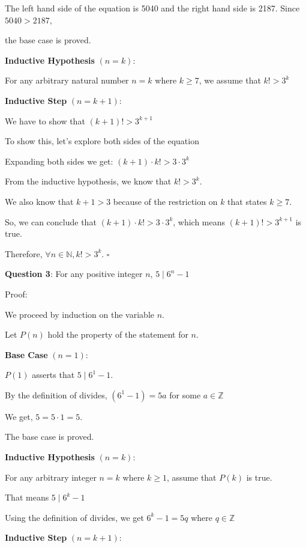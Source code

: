\documentclass{article} %
\newcommand{\question}[2][]{\begin{flushleft}
        \textbf{Question #1}: #2

\end{flushleft}}
\begin{document}
    The left hand side of the equation is 5040 and the right hand side is 2187. Since $5040 > 2187$, 
    
    the base case is proved.

    \textbf{Inductive Hypothesis} $(n = k)$:

    For any arbitrary natural number $n = k$ where $k \geq 7$, we assume that $k! > 3^k$

    \textbf{Inductive Step} $(n = k + 1)$:

    We have to show that $(k + 1)! > 3^{k + 1}$

    To show this, let's explore both sides of the equation

    Expanding both sides we get: $(k + 1) \cdot k! > 3 \cdot 3^k$ 

    From the inductive hypothesis, we know that $k! > 3^k$.

    We also know that $k + 1 > 3$ because of the restriction on $k$ that states $k \geq 7$.

    So, we can conclude that $(k + 1) \cdot k! > 3 \cdot 3^k$, which means $(k + 1)! > 3^{k + 1}$ is true.

    Therefore, $\forall n \in \mathbb{N}, k! > 3^k$. $\square$


    \newpage

    \question[3]{For any positive integer $n$, $5 \mid 6^n - 1$}

    Proof:

    We proceed by induction on the variable $n$.

    Let $P(n)$ hold the property of the statement for $n$.

    \textbf{Base Case} $(n = 1)$:

    $P(1)$ asserts that $5 \mid 6^1 - 1$.

    By the definition of divides, $(6^1 - 1) = 5a$ for some $a \in \mathbb{Z}$

    We get, $5 = 5 \cdot 1 = 5$.

    The base case is proved.

    \textbf{Inductive Hypothesis} $(n = k)$:

    For any arbitrary integer $n = k$ where $k \geq 1$, assume that $P(k)$ is true.

    That means $5 \mid 6^k - 1$

    Using the definition of divides, we get $6^k - 1 = 5q$ where $q \in \mathbb{Z}$

    \textbf{Inductive Step} $(n = k + 1)$:
\end{document}
